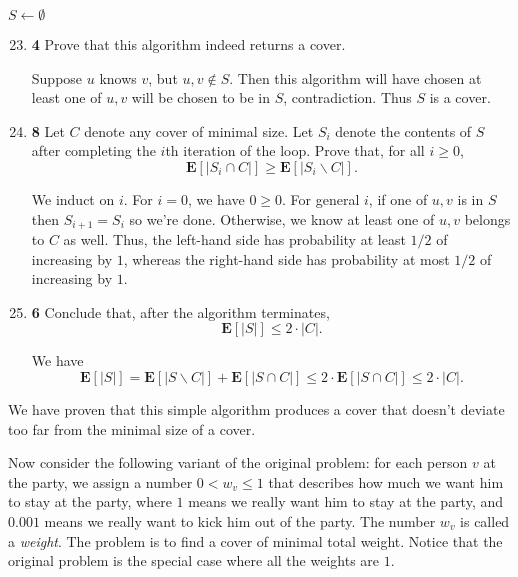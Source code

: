 \documentclass[12pt]{article}
\theoremstyle{plain}
\theoremstyle{definition}
\theoremstyle{remark}
\newcommand{\E}{\textbf{E}}
\newcommand{\pts}[1]{\lbrack\textbf{#1}\rbrack}
\begin{document}
\begin{algorithm}
\DontPrintSemicolon
{}
$S\gets\emptyset$\;
\;
\end{algorithm}

\vspace{-10pt}

\begin{enumerate}
\setcounter{enumi}{22}

\item \pts{4} Prove that this algorithm indeed returns a cover.

\begin{tcolorbox}
Suppose $u$ knows $v$, but $u,v\not\in S$. Then this algorithm will have chosen at least one of $u,v$ will be chosen to be in $S$, contradiction. Thus $S$ is a cover.
\end{tcolorbox}

\item \pts{8} Let $C$ denote any cover of minimal size. Let $S_i$ denote the contents of $S$ after completing the $i$th iteration of the loop. Prove that, for all $i\ge0$, \[\E[|S_i\cap C|]\ge\E[|S_i\backslash C|].\]

\begin{tcolorbox}
We induct on $i$. For $i=0$, we have $0\ge0$. For general $i$, if one of $u,v$ is in $S$ then $S_{i+1}=S_i$ so we're done. Otherwise, we know at least one of $u,v$ belongs to $C$ as well. Thus, the left-hand side has probability at least $1/2$ of increasing by $1$, whereas the right-hand side has probability at most $1/2$ of increasing by $1$.
\end{tcolorbox}

\item \pts{6} Conclude that, after the algorithm terminates, \[\E[|S|]\le2\cdot|C|.\]

\begin{tcolorbox}
We have \[\E[|S|]=\E[|S\backslash C|]+\E[|S\cap C|]\le2\cdot\E[|S\cap C|]\le2\cdot|C|.\]
\end{tcolorbox}
\end{enumerate}

We have proven that this simple algorithm produces a cover that doesn't deviate too far from the minimal size of a cover.

Now consider the following variant of the original problem: for each person $v$ at the party, we assign a number $0<w_v\le1$ that describes how much we want him to stay at the party, where $1$ means we really want him to stay at the party, and $0.001$ means we really want to kick him out of the party. The number $w_v$ is called a \emph{weight}. The problem is to find a cover of minimal total weight. Notice that the original problem is the special case where all the weights are $1$.
\end{document}
